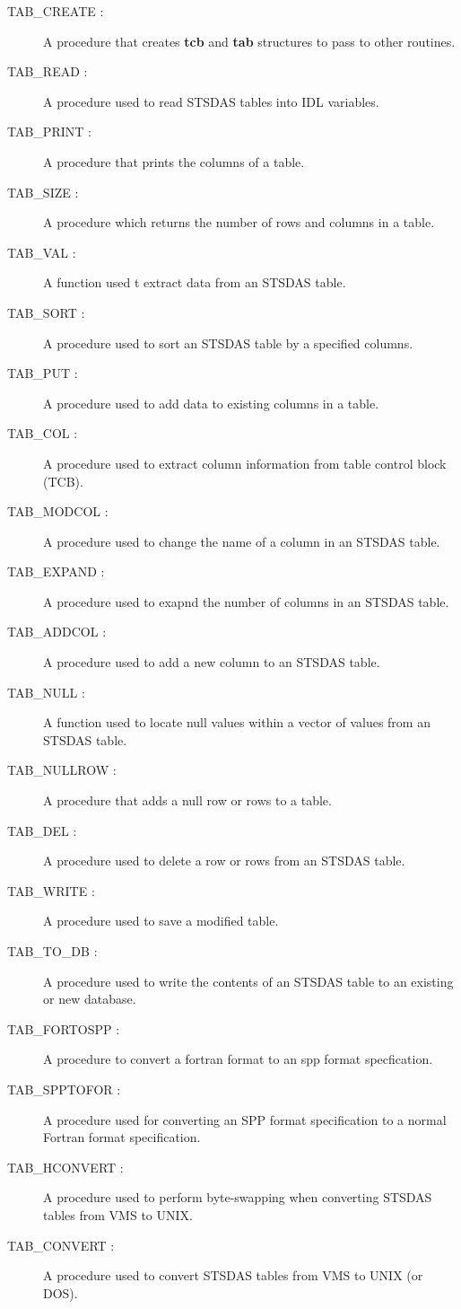 \begin{description}

\item [TAB\_CREATE :] A procedure that creates {\bf tcb} and {\bf tab} 
structures to pass to other routines.
\item [TAB\_READ :] A procedure used to read STSDAS tables into IDL variables.
\item [TAB\_PRINT :] A procedure that prints the columns of a table.
\item [TAB\_SIZE :] A procedure which returns the number of rows and columns 
in a table.
\item [TAB\_VAL :] A function used t extract data from an STSDAS table.
\item [TAB\_SORT :] A procedure used to sort an STSDAS table by a specified 
columns.
\item [TAB\_PUT :] A procedure used to add data to existing columns in a 
table.
\item [TAB\_COL :] A procedure used to extract column information from 
table control block (TCB).
\item [TAB\_MODCOL  :] A procedure used to change the name of a 
column in an STSDAS table.
\item [TAB\_EXPAND :] A procedure used to exapnd the number of 
columns in an STSDAS table.
\item [TAB\_ADDCOL :] A procedure used to add a new column to an STSDAS table.
\item [TAB\_NULL :] A function used to locate null values within a vector of 
values from an STSDAS table.
\item [TAB\_NULLROW :] A procedure that adds a null row or rows to a table.
\item [TAB\_DEL :] A procedure used to delete a row or rows from an 
STSDAS table.
\item [TAB\_WRITE :] A procedure used to save a modified table.
\item [TAB\_TO\_DB :] A procedure used to write the contents of an STSDAS 
table to an existing or new database.
\item [TAB\_FORTOSPP :] A  procedure to convert a fortran format to an spp 
format specfication.
\newpage
\item [TAB\_SPPTOFOR :] A 
procedure used for converting an SPP format 
specification to a normal Fortran format specification.
\item [TAB\_HCONVERT :] A procedure used to perform byte-swapping when 
converting STSDAS tables from VMS to UNIX. 
\item [TAB\_CONVERT :] A procedure used to convert STSDAS tables from VMS to 
UNIX (or DOS).
\end{description}


